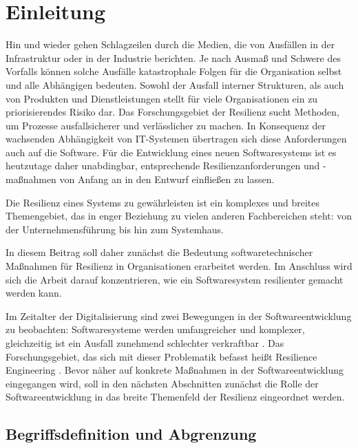 \documentclass[]{lni}
\begin{document}
\section*{Einleitung} \label{intro}


Hin und wieder gehen Schlagzeilen durch die Medien, die von Ausfällen in der Infrastruktur oder in der Industrie berichten. Je nach Ausmaß und Schwere des Vorfalls können solche Ausfälle katastrophale Folgen für die Organisation selbst und alle Abhängigen bedeuten. Sowohl der Ausfall interner Strukturen, als auch von Produkten und Dienstleistungen stellt für viele Organisationen ein zu priorisierendes Risiko dar. Das Forschungsgebiet der Resilienz sucht Methoden, um Prozesse ausfallsicherer und verlässlicher zu machen. In Konsequenz der wachsenden Abhängigkeit von IT-Systemen übertragen sich diese Anforderungen auch auf die Software. Für die Entwicklung eines neuen Softwaresystems ist es heutzutage daher unabdingbar, entsprechende Resilienzanforderungen und -maßnahmen von Anfang an in den Entwurf einfließen zu lassen. 

Die Resilienz eines Systems zu gewährleisten ist ein komplexes und breites Themengebiet, das in enger Beziehung zu vielen anderen Fachbereichen steht: von der Unternehmensführung bis hin zum Systemhaus.

In diesem Beitrag soll daher zunächst die Bedeutung softwaretechnischer Maßnahmen für Resilienz in Organisationen erarbeitet werden. Im Anschluss wird sich die Arbeit darauf konzentrieren, wie ein Softwaresystem resilienter gemacht werden kann.

Im Zeitalter der Digitalisierung sind zwei Bewegungen in der Softwareentwicklung zu beobachten: Softwaresysteme werden umfangreicher und komplexer, gleichzeitig ist ein Ausfall zunehmend schlechter verkraftbar \cite[3]{CharlesPerrow.2000}. Das Forschungsgebiet, das sich mit dieser Problematik befasst heißt \glqq Resilience Engineering\grqq{} \cite{JonathanJohnson.20221101}. Bevor näher auf konkrete Maßnahmen in der Softwareentwicklung eingegangen wird, soll in den nächsten Abschnitten zunächst die Rolle der Softwareentwicklung in das breite Themenfeld der Resilienz eingeordnet werden.

\subsection*{Begriffsdefinition und Abgrenzung} \label{placement-definition}
\end{document}
